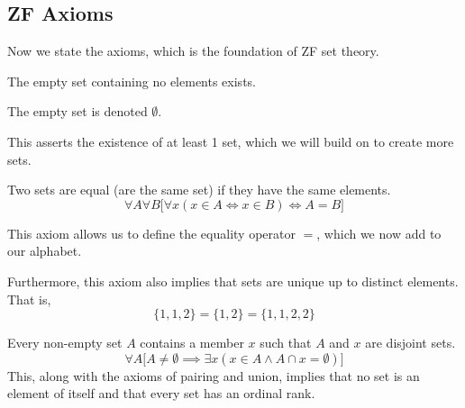 \subsection{ZF Axioms}

  Now we state the axioms, which is the foundation of ZF set theory. 

  \begin{axiom}
    The empty set containing no elements exists. 
  \end{axiom}

  \begin{definition}
    The empty set is denoted $\emptyset$. 
  \end{definition}

  This asserts the existence of at least 1 set, which we will build on to create more sets. 

  \begin{axiom}
    Two sets are equal (are the same set) if they have the same elements. 
    \begin{equation}
      \forall A \forall B \big[ \forall x (x \in A \iff x \in B) \iff A = B\big]
    \end{equation}
  \end{axiom} 

  \begin{definition}[Equality]
    This axiom allows us to define the equality operator $=$, which we now add to our alphabet. 
  \end{definition}

  \begin{theorem}
    Furthermore, this axiom also implies that sets are unique up to distinct elements. That is, 
    \begin{equation}
      \{1, 1, 2\} = \{1, 2\} = \{1, 1, 2, 2\}
    \end{equation}
  \end{theorem}

  \begin{axiom}
    Every non-empty set $A$ contains a member $x$ such that $A$ and $x$ are disjoint sets. 
    \begin{equation}
      \forall A \big[ A \neq \emptyset \implies \exists x (x \in A \land A \cap x = \emptyset) \big]
    \end{equation}
    This, along with the axioms of pairing and union, implies that no set is an element of itself and that every set has an ordinal rank. 
  \end{axiom}


